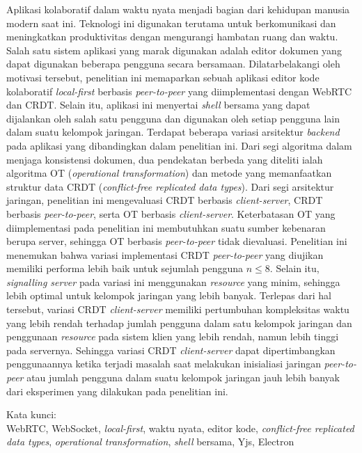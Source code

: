 \noindent Aplikasi kolaboratif dalam waktu nyata menjadi bagian dari kehidupan manusia modern saat ini. Teknologi ini digunakan terutama untuk berkomunikasi dan meningkatkan produktivitas dengan mengurangi hambatan ruang dan waktu. Salah satu sistem aplikasi yang marak digunakan adalah editor dokumen yang dapat digunakan beberapa pengguna secara bersamaan. Dilatarbelakangi oleh motivasi tersebut, penelitian ini memaparkan sebuah aplikasi editor kode kolaboratif \textit{local-first} berbasis \textit{peer-to-peer} yang diimplementasi dengan WebRTC dan CRDT. Selain itu, aplikasi ini menyertai \textit{shell} bersama yang dapat dijalankan oleh salah satu pengguna dan digunakan oleh setiap pengguna lain dalam suatu kelompok jaringan. Terdapat beberapa variasi arsitektur \textit{backend} pada aplikasi yang dibandingkan dalam penelitian ini. Dari segi algoritma dalam menjaga konsistensi dokumen, dua pendekatan berbeda yang diteliti ialah algoritma OT (\textit{operational transformation}) dan metode yang memanfaatkan struktur data CRDT (\textit{conflict-free replicated data types}). Dari segi arsitektur jaringan, penelitian ini mengevaluasi CRDT berbasis \textit{client-server}, CRDT berbasis \textit{peer-to-peer}, serta OT berbasis \textit{client-server}. Keterbatasan OT yang diimplementasi pada penelitian ini membutuhkan suatu sumber kebenaran berupa server, sehingga OT berbasis \textit{peer-to-peer} tidak dievaluasi. Penelitian ini menemukan bahwa variasi implementasi CRDT \textit{peer-to-peer} yang diujikan memiliki performa lebih baik untuk sejumlah pengguna $n \leq 8$. Selain itu, \textit{signalling server} pada variasi ini menggunakan \textit{resource} yang minim, sehingga lebih optimal untuk kelompok jaringan yang lebih banyak. Terlepas dari hal tersebut, variasi CRDT \textit{client-server} memiliki pertumbuhan kompleksitas waktu yang lebih rendah terhadap jumlah pengguna dalam satu kelompok jaringan dan penggunaan \textit{resource} pada sistem klien yang lebih rendah, namun lebih tinggi pada servernya. Sehingga variasi CRDT \textit{client-server} dapat dipertimbangkan penggunaannya ketika terjadi masalah saat melakukan inisialiasi jaringan \textit{peer-to-peer} atau jumlah pengguna dalam suatu kelompok jaringan jauh lebih banyak dari eksperimen yang dilakukan pada penelitian ini.\\

\vspace*{0.2cm}

\noindent Kata kunci: \\ WebRTC, WebSocket, \textit{local-first}, waktu nyata, editor kode, \textit{conflict-free replicated data types}, \textit{operational transformation}, \textit{shell} bersama, Yjs, Electron \\

\newpage
